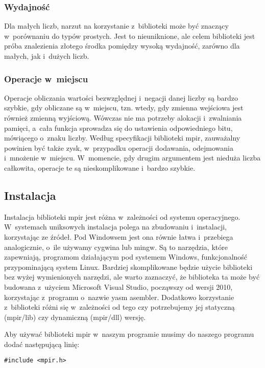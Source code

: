 \subsubsection{Wydajność}
Dla małych liczb, narzut na korzystanie z~biblioteki może być znaczący w~porównaniu do typów prostych. Jest to nieuniknione, ale celem biblioteki jest próba znalezienia złotego środka pomiędzy wysoką wydajność, zarówno dla małych, jak i~dużych liczb. 

\subsubsection{Operacje w~miejscu}
Operacje obliczania wartości bezwzględnej i~negacji danej liczby są bardzo szybkie, gdy obliczane są w~miejscu, tzn. wtedy, gdy zmienna wejściowa jest również zmienną wyjściową. Wówczas nie ma potrzeby alokacji i~zwalniania pamięci, a~cała funkcja sprowadza się do ustawienia odpowiedniego bitu, mówiącego o~znaku liczby. Według specyfikacji biblioteki mpir, zauważalny powinien być także zysk, w~przypadku operacji dodawania, odejmowania i~mnożenie w~miejscu. W~momencie, gdy drugim argumentem jest nieduża liczba całkowita, operacje te są nieskomplikowane i~bardzo szybkie.

\subsection{Instalacja}

Instalacja biblioteki mpir jest różna w~zależności od systemu operacyjnego. W~systemach uniksowych instalacja polega na zbudowaniu i~instalacji, korzystając ze źródeł. Pod Windowsem jest ona równie łatwa i~przebiega analogicznie, o~ile używamy cygwina lub mingw. Są to narzędzia, które zapewniają, programom działającym pod systemem Windows, funkcjonalność przypominającą system Linux. Bardziej skomplikowane będzie użycie biblioteki bez wyżej wymienionych narzędzi, ale warto zaznaczyć, że biblioteka ta może być budowana z~użyciem Microsoft Visual Studio, począwszy od wersji 2010, korzystając z~programu o~nazwie yasm asembler. Dodatkowo korzystanie z~biblioteki różni się w~zależności od tego czy potrzebujemy jej statyczną (mpir/lib) czy dynamiczną (mpir/dll) wersję.

Aby używać biblioteki mpir w~naszym programie musimy do naszego programu dodać następującą linię:
\begin{lstlisting}
#include <mpir.h>
\end{lstlisting}

